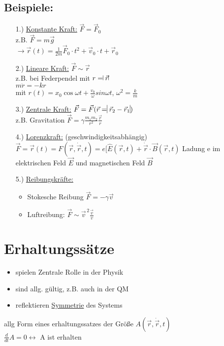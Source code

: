 \documentclass[titlepage,12pt,a4paper,ngerman]{report}
\begin{document}
{\subsection{Beispiele:}
\begin{itemize}
	\item[1.)] \underline{Konstante Kraft:} $\vec{F} =\vec{F}_{0}$\\
	z.B. $\vec{F}=m\vec{g}$\\
	$\rightarrow \vec{r}(t) = \frac{1}{2m} \vec{F}_{0} \cdot t^2 + \vec{v}_{0} \cdot t+\vec{r}_{0}$
	\item[2.)] \underline{Lineare Kraft:} $\vec{F} \sim \vec{r}$\\
	z.B. bei Federpendel mit $r= \vline \vec{r}\vline $\\
	$m\ddot{r} = - k r$\\
	mit $r(t) = x_{0} \cos{\omega t} + \frac{v_{0}}{\omega} sin{\omega t}$, $\omega^2 = \frac{k}{m}$\\
	\item[3.)] \underline{Zentrale Kraft:} $\vec{F} = \vec{F}(\vec{r}=\vline \vec{r}_{2}-\vec{r}_{1}\vline )$\\
	z.B. Gravitation $\vec{F} = \gamma \frac{m_1 m_2 }{r^2} \frac{\vec{r}}{ r}$
	\item[4.)] \underline{Lorenzkraft:} (geschwindigkeitsabhängig)\\
	$\vec{F}={\vec{r}}(t) = F(\vec{r},\dot{\vec{r}}, t) = e[\hat{E} (\vec{r}, t) + \dot{\vec{r}} \cdot \vec{B} (\vec{r},t)$
	Ladung e im elektrischen Feld $\vec{E}$ und magnetischen Feld $\vec{B}$
	\item[5.)] \underline{Reibungskräfte:}
	\begin{itemize}
		\item Stokesche Reibung $\vec{F} = -\gamma \vec{v}$
		\item Luftreibung: $\vec{F} \sim \vec{v}^{\,2} \frac{\vec{v}}{v}$
	\end{itemize}
\end{itemize}

\section{Erhaltungssätze}
\begin{itemize}
	\item spielen Zentrale Rolle in der Physik
	\item sind allg. gültig, z.B. auch in der QM
	\item reflektieren \underline{Symmetrie} des Systems
\end{itemize}
allg Form eines erhaltungssatzes der Größe $A(\vec{r},\dot{\vec{r}},t)$\\
$\frac{d}{dt} A = 0 \leftrightarrow $ A ist erhalten\par

}
\end{document}

